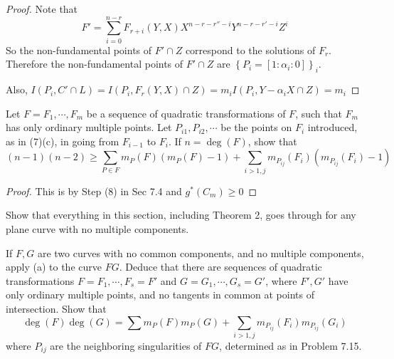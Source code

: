 \documentclass{solution}
\begin{document}
\begin{proof}
    Note that
    $$F' = \sum\limits_{i = 0}^{n - r} F_{r + i} (Y, X)X^{n - r - r'' - i} Y^{n - r - r' - i}Z^i$$
    So the non-fundamental points of $F' \cap Z$ correspond to the solutions of $F_r$. Therefore the non-fundamental points of $F' \cap Z$ are $\left\lbrace P_i = [1:\alpha_i:0] \right\rbrace_i$.

    Also, $I(P_i, C' \cap L) = I(P_i, F_r(Y, X)\cap Z) = m_i I(P_i, Y - \alpha_i X \cap Z) = m_i$
\end{proof}

\begin{problem}{7.15}
    Let $F = F_1, \cdots, F_m$ be a sequence of quadratic transformations of $F$, such that $F_m$ has only ordinary multiple points. Let $P_{i1}, P_{i2}, \cdots$ be the points on $F_i$ introduced, as in (7)(c), in going from $F_{i - 1}$ to $F_i$. If $n = \deg(F)$, show that
    $$(n - 1)(n - 2) \ge \sum\limits_{P \in F} m_P(F) (m_P(F) - 1) + \sum\limits_{i \gt 1, j} m_{P_{ij}}(F_i)(m_{P_{ij}}(F_i) - 1)$$
\end{problem}

\begin{proof}
    This is by Step (8) in Sec 7.4 and $g^*(C_m) \ge 0$
\end{proof}

\begin{problem}{7.16}
    \begin{inparaenum}
        \item Show that everything in this section, including Theorem 2, goes through for any plane curve with no multiple components.
        \item If $F, G$ are two curves with no common components, and no multiple components, apply (a) to the curve $FG$. Deduce that there are sequences of quadratic transformations $F = F_1, \cdots, F_s = F'$ and $G = G_1, \cdots, G_s = G'$, where $F', G'$ have only ordinary multiple points, and no tangents in common at points of intersection. Show that
        $$\deg(F) \deg(G) = \sum m_P(F) m_P(G) + \sum\limits_{i \gt 1, j} m_{P_{ij}}(F_i) m_{P_{ij}}(G_i)$$
        where $P_{ij}$ are the neighboring singularities of $FG$, determined as in Problem 7.15.
    \end{inparaenum}
\end{problem}
\end{document}
